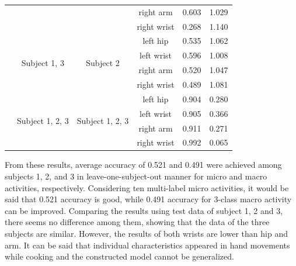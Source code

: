 \documentclass{svmult}
\begin{document}
\begin{table}[h]
\begin{tabular}{c|c|c|c|c|c}
         &&&right arm&0.603 &1.029\\
         &&&right wrist&0.268 &1.140\\\cline{2-6}
         & \multirow{4}{*}{Subject 1, 3}& \multirow{4}{*}{Subject 2} & left hip&0.535 &1.062\\
         &&&left wrist&0.596 &1.008\\
         &&&right arm&0.520 &1.047\\
         &&&right wrist&0.489 &1.081\\\cline{2-6}
         & \multirow{4}{*}{Subject 1, 2, 3}& \multirow{4}{*}{Subject 1, 2, 3} & left hip&0.904 &0.280\\
         &&&left wrist&0.905 &0.366\\
         &&&right arm&0.911 &0.271\\
         &&&right wrist&0.992 &0.065\\\hline
    \end{tabular}
\end{table}









From these results, average accuracy of 0.521 and 0.491 were achieved among subjects 1, 2, and 3 in leave-one-subject-out manner for micro and macro activities, respectively. Considering ten multi-label micro activities, it would be said that 0.521 accuracy is good, while 0.491 accuracy for 3-class macro activity can be improved. Comparing the results using test data of subject 1, 2 and 3, there seems no difference among them, showing that the data of the three subjects are similar. However, the results of both wrists are lower than hip and arm. It can be said that individual characteristics appeared in hand movements while cooking and the constructed model cannot be generalized. 
\end{document}
